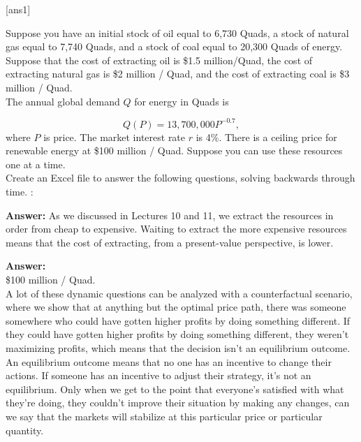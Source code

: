 [ans1]

\begin{enumerate}

\begin{Exercise}{Suppose you have an initial stock of oil equal to 6,730 Quads, a stock of natural gas equal to 7,740 Quads, and a stock of coal equal to 20,300 Quads of energy. Suppose that the cost of extracting oil is \$1.5 million/Quad, the cost of extracting natural gas is \$2 million / Quad, and the cost of extracting coal is \$3 million / Quad.\\

The annual global demand $Q$ for energy in Quads is 

    \begin{equation}
        Q(P) = 13,700,000P^{-0.7},
        \label{eq:demandenergy}
    \end{equation}
    where $P$ is price. The market interest rate $r$ is 4\%. There is a ceiling price for renewable energy at \$100 million / Quad. Suppose you can use these resources one at a time.\\
    
    Create an Excel file to answer the following questions, solving backwards through time.
    :}
    

    
    
     \begin{sol}
         \textbf{Answer:} As we discussed in Lectures 10 and 11, we extract the resources in order from cheap to expensive. Waiting to extract the more expensive resources means that the cost of extracting, from a present-value perspective, is lower.\\
         
     \end{sol}
    

    

      \begin{sol}
       \textbf{Answer:}\\
       
       \$100 million / Quad.\\
       

       A lot of these dynamic questions can be analyzed with a counterfactual scenario, where we show that at anything but the optimal price path, there was someone somewhere who could have gotten higher profits by doing something different. If they could have gotten higher profits by doing something different, they weren't maximizing profits, which means that the decision isn't an equilibrium outcome. An equilibrium outcome means that no one has an incentive to change their actions. If someone has an incentive to adjust their strategy, it's not an equilibrium. Only when we get to the point that everyone's satisfied with what they're doing, they couldn't improve their situation by making any changes, can we say that the markets will stabilize at this particular price or particular quantity.\\
       

\end{sol}
\end{Exercise}
\end{enumerate}

